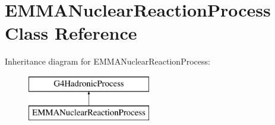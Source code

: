 \hypertarget{classEMMANuclearReactionProcess}{\section{E\-M\-M\-A\-Nuclear\-Reaction\-Process Class Reference}
\label{classEMMANuclearReactionProcess}
}
Inheritance diagram for E\-M\-M\-A\-Nuclear\-Reaction\-Process\-:\begin{figure}[H]
\begin{center}
\leavevmode
\includegraphics[height=2.000000cm]{classEMMANuclearReactionProcess}
\end{center}
\end{figure}
